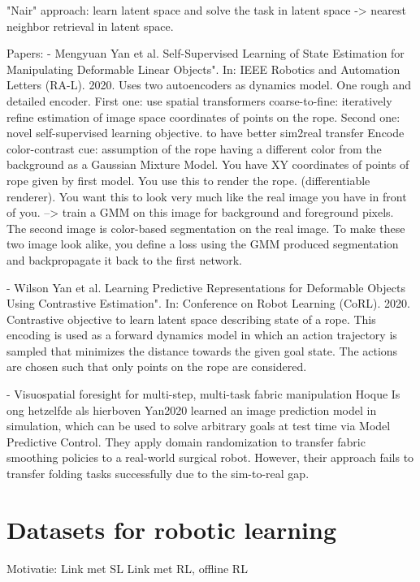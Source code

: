 \documentclass[\home/main.tex]{subfiles}
\begin{document}
"Nair" approach: learn latent space and solve the task in latent space -> nearest neighbor retrieval in latent space.

Papers:
- Mengyuan Yan et al. Self-Supervised Learning of State Estimation for Manipulating Deformable Linear Objects". In: IEEE Robotics and Automation Letters (RA-L). 2020.
	Uses two autoencoders as dynamics model. One rough and detailed encoder.
	First one:
	use spatial transformers
	coarse-to-fine: iteratively refine estimation of image space coordinates of points on the rope.
	Second one: novel self-supervised learning objective.
	to have better sim2real transfer
	Encode color-contrast cue: assumption of the rope having a different color from the background as a Gaussian Mixture Model.
	You have XY coordinates of points of rope given by first model. You use this to render the rope.  (differentiable renderer). You want this to look very much like the real image you have in front of you. --> train a GMM on this image for background and foreground pixels.
	The second image is color-based segmentation on the real image.
	To make these two image look alike, you define a loss using the GMM produced segmentation and backpropagate it back to the first network.



- Wilson Yan et al. Learning Predictive Representations for Deformable Objects Using Contrastive Estimation". In: Conference on Robot Learning (CoRL). 2020.
	Contrastive objective to learn latent space describing state of a rope. This encoding is used as a forward dynamics model in which an action trajectory is sampled that minimizes the distance towards the given goal state. The actions are chosen such that only points on the rope are considered.

- Visuospatial foresight for multi-step, multi-task fabric manipulation Hoque
	Is ong hetzelfde als hierboven Yan2020
	learned an image prediction model in simulation, which can be used to solve arbitrary goals at test time via Model Predictive Control. They apply domain randomization to transfer fabric smoothing policies to a real-world surgical robot. However, their approach fails to transfer folding tasks successfully due to the sim-to-real gap.

\section{Datasets for robotic learning} \label{sec:lit_datasets}
Motivatie:
	Link met SL
	Link met RL, offline RL
\end{document}
